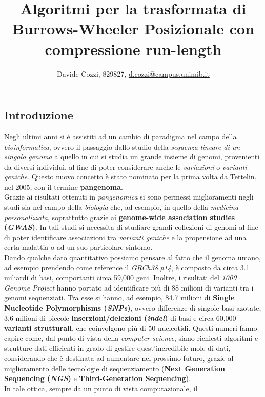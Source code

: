 \documentclass[a4paper,11pt, oneside]{article}
\title{\vspace{-1.75cm}Algoritmi per la trasformata di Burrows-Wheeler
  Posizionale con compressione run-length}
\author{Davide Cozzi, 829827, 
  \href{mailto:d.cozzi@campus.unimib.it}{d.cozzi@campus.unimib.it}}
\date{}
\begin{document}
\maketitle
{}
\noindent
\subsection*{Introduzione}
Negli ultimi anni si è assistiti ad un cambio di paradigma nel campo della
\textit{bioinformatica}, ovvero il passaggio dallo studio della \textit{sequenza
  lineare di un singolo genoma} a quello in cui si studia un grande insieme di
genomi, provenienti da diversi individui, al fine di poter considerare anche le
\textit{variazioni} o \textit{varianti geniche}. Questo nuovo concetto è stato
nominato per la prima 
volta da Tettelin, nel 2005, con il termine \textbf{pangenoma}.\\
Grazie ai risultati ottenuti in \textit{pangenomica} si sono permessi
miglioramenti negli studi sia nel campo della \textit{biologia} che, ad esempio,
in quello della \textit{medicina personalizzata}, soprattutto grazie ai
\textbf{genome-wide association studies (\textit{GWAS})}. In tali studi si
necessita di studiare grandi collezioni di genomi al fine di poter identificare
associazioni tra \textit{varianti geniche} e la propensione ad una certa
malattia o ad un suo particolare sintomo.\\
Dando qualche dato quantitativo possiamo pensare al fatto che il genoma umano,
ad esempio prendendo come reference il \textit{GRCh38.p14}, è composto da circa
3.1 miliardi di basi, comportanti circa 59,000 geni. Inoltre, i risultati del
\textit{1000 Genome Project} hanno portato ad identificare più di 88 milioni di
varianti tra i genomi sequenziati. Tra esse si hanno, ad esempio, 84.7 milioni
di \textbf{Single Nucleotide Polymorphisms (\textit{SNPs})}, ovvero differenze
di singole basi azotate, 3.6 milioni di piccole \textbf{inserzioni/delezioni
  (\textit{indel})} di basi e circa 60,000 \textbf{varianti strutturali},
che coinvolgono più di 50 nucleotidi. Questi numeri fanno capire come, dal punto
di vista della \textit{computer science}, siano richiesti algoritmi e strutture
dati efficienti in grado di gestire quest'incredibile mole di dati, considerando
che è destinata ad aumentare nel prossimo futuro, grazie al miglioramento delle
tecnologie di sequenziamento (\textbf{Next Generation Sequencing (\textit{NGS})}
e \textbf{Third-Generation Sequencing}).\\ 
In tale ottica, sempre da un punto di vista computazionale, il
\end{document}
